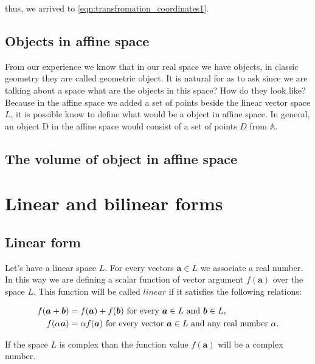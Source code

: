 \documentclass{book}
\begin{document}
thus, we arrived to \eqref{eqn:transfromation_coordinates1}.

\section{Objects in affine space}

From our experience we know that in our real space we have objects, in classic geometry they are called geometric object. It is natural for as to ask since we are talking about a space what are the objects in this space? How do they look like? Because in the affine space we added a set of points beside the linear vector space $L$, it is possible know to define what would be a object in affine space. In general, an object D in the affine space would consist of a set of points $D$ from $\mathbb{A}$.

\section{The volume of object in affine space}

\chapter{Linear and bilinear forms}

\section{Linear form}

Let's have a linear space $L$. For every vectors $\boldsymbol{a} \in L$ we associate a real number. In this way we are defining a scalar function of vector argument $f(\boldsymbol{a})$ over the space $L$. This function will be called $linear$ if it satisfies the following relations:

\begin{align}
f(\boldsymbol{a} + \boldsymbol{b}) &= f(\boldsymbol{a}) + f(\boldsymbol{b}) \textnormal{ for every } \boldsymbol{a} \in L \textnormal{ and } \boldsymbol{b} \in L\textnormal{,} \label{linearfunction_1} \\
f(\alpha\boldsymbol{a}) &= \alpha f(\boldsymbol{a}) \textnormal{ for every vector } \boldsymbol{a} \in L \textnormal{ and any real number } \alpha. \label{linearfunction_2}
\end{align}

If the space $L$ is complex than the function value $f(\boldsymbol{a})$ will be a complex number.
\end{document}
